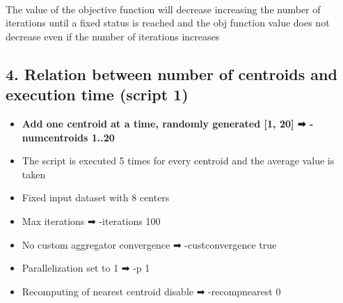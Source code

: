 \documentclass[11pt]{article}
\providecommand{\tightlist}{%
      \setlength{\itemsep}{0pt}\setlength{\parskip}{0pt}}
\begin{document}
    \begin{center}
    \end{center}
    { \hspace*{\fill} \\}
    
    The value of the objective function will decrease increasing the number
of iterations until a fixed status is reached and the obj function value
does not decrease even if the number of iterations increases

    \hypertarget{relation-between-number-of-centroids-and-execution-time-script-1}{%
\subsection{4. Relation between number of centroids and execution time
(script
1)}\label{relation-between-number-of-centroids-and-execution-time-script-1}}

\begin{itemize}
\tightlist
\item
  \textbf{Add one centroid at a time, randomly generated {[}1, 20{]} ➡
  -numcentroids 1..20}
\item
  The script is executed 5 times for every centroid and the average
  value is taken
\item
  Fixed input dataset with 8 centers
\item
  Max iterations ➡ -iterations 100
\item
  No custom aggregator convergence ➡ -custconvergence true
\item
  Parallelization set to 1 ➡ -p 1
\item
  Recomputing of nearest centroid disable ➡ -recompnearest 0
\end{itemize}
\end{document}
